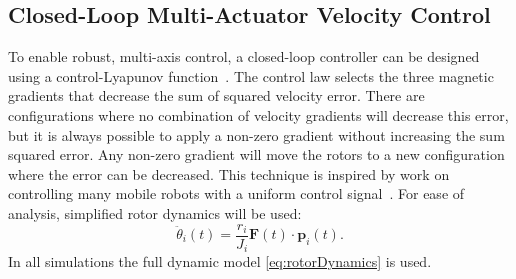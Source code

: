 \subsection{Closed-Loop Multi-Actuator Velocity Control }\label{subsec:ControlLyapunov}
   To enable robust, multi-axis control, a closed-loop controller can be designed using a control-Lyapunov function~\cite{Artstein1983}.  The control law selects the three magnetic gradients that decrease the sum of squared velocity error. There are configurations where no combination of velocity gradients will decrease this error, but it is always possible to apply a non-zero gradient without increasing the sum squared error. Any non-zero gradient will move the rotors to a new configuration where the error can be decreased. This technique is inspired by work on controlling many mobile robots with a uniform control signal~\cite{Becker2012k}.
  For ease of analysis, simplified rotor dynamics will be used: 
   \begin{equation}
\ddot{\theta}_i(t) =   \frac{r_i}{J_i} \mathbf{F}(t)\cdot \mathbf{p}_i(t).
\label{eq:rotorDynamicsSimple}
\end{equation}
   In all simulations the full dynamic model \eqref{eq:rotorDynamics} is used.
   
